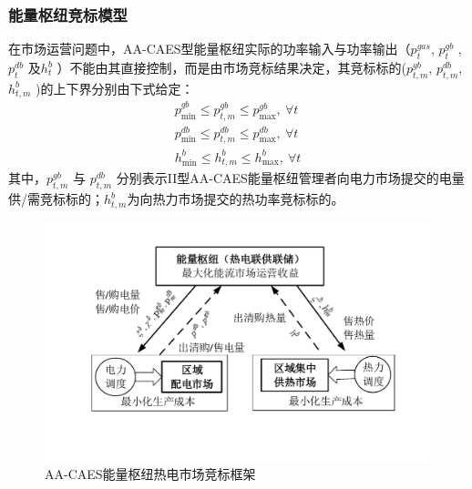 \subsubsection{能量枢纽竞标模型}
在市场运营问题中，AA-CAES型能量枢纽实际的功率输入与功率输出（$p_t^{gas}$, $p_t^{gb}$ , $p_t^{db}$ 及$h_t^b$ ）不能由其直接控制，而是由市场竞标结果决定，其竞标标的($p_{t,m}^{gb}$, $p_{t,m}^{db}$, $h_{t,m}^{b}$ )的上下界分别由下式给定：
\begin{subequations}
\label{eq:EH-Bid-Cons}
\begin{gather}
p_{\min }^{gb} \le p_{t,m}^{gb} \le p_{\max }^{gb}, ~\forall t \label{eq:EH-E-offer} \\
p_{\min }^{db} \le p_{t,m}^{db} \le p_{\max }^{db}, ~\forall t \label{eq:EH-E-bid} \\
h_{\min }^b \le h_{t,m}^b \le h_{\max }^b, ~\forall t \label{eq:EH-H-offer}
\end{gather}
\end{subequations}
其中，$p_{t,m}^{gb}$ 与 $p_{t,m}^{db}$ 分别表示II型AA-CAES能量枢纽管理者向电力市场提交的电量供/需竞标标的；$h_{t,m}^b$为向热力市场提交的热功率竞标标的。

\begin{figure}
\centering
\includegraphics[scale=0.75]{figures/Chap4-5-EH-PAB-Struct.pdf}
\caption{AA-CAES能量枢纽热电市场竞标框架}
\label{Fig:Market}
\end{figure}


